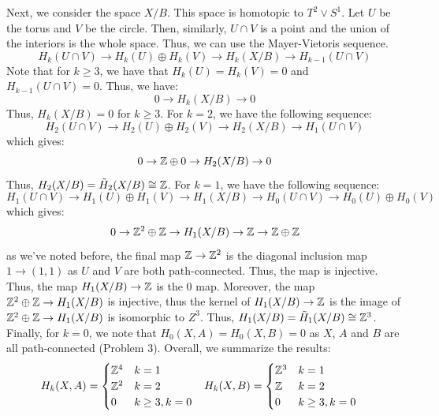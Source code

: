 \documentclass[12pt]{article}
\begin{document}
\begin{solution}
\begin{enumerate}
        Next, we consider the space $X/B$. This space is homotopic to $T^2 \vee S^1$. Let $U$ be the torus and $V$ be the circle. Then, similarly, $U \cap V$ is a point and the union of the interiors is the whole space. Thus, we can use the Mayer-Vietoris sequence. 
        \[ H_k(U \cap V) \to H_k(U) \oplus H_k(V) \to H_k(X/B) \to H_{k-1}(U \cap V)\]
        Note that for $k \geq 3$, we have that $H_k(U) = H_k(V) = 0$ and $H_{k-1}(U \cap V) = 0$. Thus, we have:
        \[ 0 \to H_k(X/B) \to 0\]
        Thus, $H_k(X/B) = 0$ for $k \geq 3$. \bbni
        For $k = 2$, we have the following sequence:
        \[ H_2(U \cap V) \to H_2(U) \oplus H_2(V) \to H_2(X/B) \to H_{1}(U \cap V)  \]
        which gives:
        \[ 0 \to \mathbb Z \oplus 0 \to H_2(X/B) \to 0  \]
        Thus, $H_2(X/B) = \tilde H_2(X/B) \cong \mathbb Z$. \bbni
        For $k = 1$, we have the following sequence:
        \[ H_1(U \cap V) \to H_1(U) \oplus H_1(V) \to H_1(X/B) \to H_0(U \cap V) \to H_0(U) \oplus H_0(V) \]
        which gives:
        \[ 0 \to \mathbb Z^2 \oplus \mathbb Z \to H_1(X/B) \to \mathbb Z \to \mathbb Z \oplus \mathbb Z  \]             
        as we've noted before, the final map $\mathbb Z \to \mathbb Z^2$ is the diagonal inclusion map $1 \to (1, 1)$ as $U$ and $V$ are both path-connected. Thus, the map is injective. Thus, the map $H_1(X/B) \to \mathbb Z$ is the $0$ map. Moreover, the map $\mathbb Z^2 \oplus \mathbb Z \to H_1(X/B)$ is injective, thus the kernel of $H_1(X/B) \to \mathbb Z$ is the image of $\mathbb Z^2 \oplus \mathbb Z \to H_1(X/B)$ is isomorphic to $Z^3$. Thus, $H_1(X/B) = \tilde H_1(X/B) \cong \mathbb Z^3$. \bbni
        Finally, for $k = 0$, we note that $H_0(X, A) = H_0(X, B) = 0$ as $X$, $A$ and $B$ are all path-connected (Problem 3). \bbni  
        Overall, we summarize the results:
        \begin{align*}
            H_k(X, A) &= \begin{cases} \mathbb Z^4 & k = 1\\ \mathbb Z^2& k = 2 \\ 0 & k \geq 3, k = 0\end{cases} & H_k(X, B) &= \begin{cases} \mathbb Z^3 & k = 1\\ \mathbb Z& k = 2 \\ 0 & k \geq 3, k =0 \end{cases}
        \end{align*}
    \end{enumerate}
\end{solution}
\end{document}
